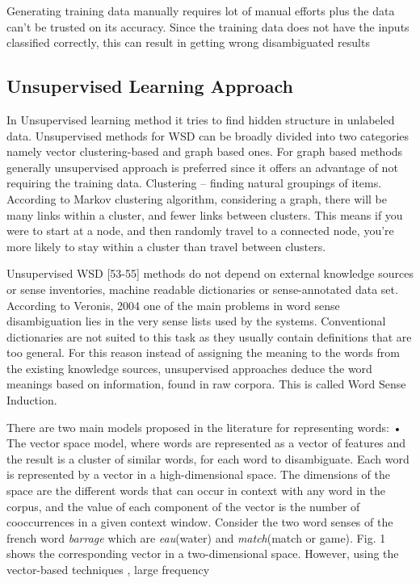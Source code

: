 \documentclass[article,dr=phil,type=drfinal,colorback,accentcolor=tud9c]{tudthesis}
\begin{document}
Generating training data manually requires lot of manual efforts plus the data
can’t be trusted on its accuracy. Since the training data does not have the inputs
classified correctly, this can result in getting wrong disambiguated results

\subsection{Unsupervised Learning Approach}
In Unsupervised learning method it tries to find hidden structure in
unlabeled data. Unsupervised methods for WSD can be broadly divided into two
categories namely vector clustering-based and graph based ones. For graph based
methods generally unsupervised approach is preferred since it offers an
advantage of not requiring the training data.
Clustering – finding natural groupings of items. According to Markov clustering algorithm, considering a graph, there will be many links within a cluster, and fewer links between clusters. This means if you were to start at a node, and then randomly travel to a connected node, you’re more likely to stay within a cluster than travel between clusters.

Unsupervised WSD [53-55] methods do not depend on external knowledge sources or sense inventories, machine readable dictionaries or sense-annotated data set. According to Veronis, 2004 one of the main problems in word sense disambiguation lies in the very sense lists used by the systems. Conventional dictionaries are not suited to this task as they usually contain definitions that are too general.  For this reason instead of assigning the meaning to the words from the existing knowledge sources, unsupervised approaches deduce the word meanings based on information, found in raw corpora. This is called Word Sense Induction.

There are two main models proposed in the literature for
representing words:
• The vector space model, where words are represented as
a vector of features and the result is a cluster of similar
words, for each word to disambiguate. Each word is represented by a vector in a high-dimensional space. The dimensions of the space are the different words that can occur in context with any word in the corpus, and the value of each component of the vector is the number of cooccurrences in a given context window. Consider the two word senses of the french word \textit{barrage} which are \textit{eau}(water) and \textit{match}(match or game). Fig. 1 shows the corresponding vector in a two-dimensional space. However, using the vector-based techniques , large frequency 
\end{document}
